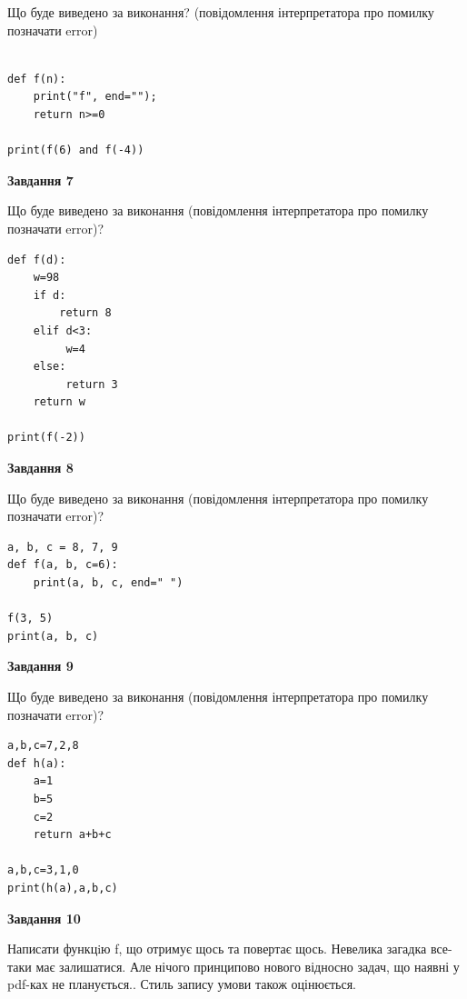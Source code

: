 \documentclass[12pt, ukrainian]{article}
\begin{document}
{\begin {large}
Що буде виведено за виконання? (повідомлення інтерпретатора про помилку позначати error)\par
\begin{verbatim}

def f(n):
    print("f", end="");
    return n>=0

print(f(6) and f(-4))
\end{verbatim}

{\begin {center}\textbf{Завдання 7}\end {center}}

Що буде виведено за виконання (повідомлення інтерпретатора про помилку позначати error)?\par
\begin{verbatim}
def f(d):
    w=98
    if d: 
        return 8
    elif d<3:
         w=4
    else:
         return 3
    return w

print(f(-2))
\end{verbatim}

{\begin {center}\textbf{Завдання 8}\end {center}}

Що буде виведено за виконання (повідомлення інтерпретатора про помилку позначати error)?\par
\begin{verbatim}
a, b, c = 8, 7, 9
def f(a, b, c=6):
    print(a, b, c, end=" ")

f(3, 5)
print(a, b, c)
\end{verbatim}

{\begin {center}\textbf{Завдання 9}\end {center}}

Що буде виведено за виконання (повідомлення інтерпретатора про помилку позначати error)?\par
\begin{verbatim}
a,b,c=7,2,8
def h(a):
    a=1
    b=5
    c=2
    return a+b+c

a,b,c=3,1,0
print(h(a),a,b,c)
\end{verbatim}

{\begin {center}\textbf{Завдання 10}\end {center}}


Написати функцiю f, що отримує щось та повертає щось. Невелика загадка все-таки має залишатися. Але нічого принципово нового відносно задач, що наявні у pdf-ках не планується.. Стиль запису умови також оцінюється.\par
\end {large}}
\newpage
\end{document}
